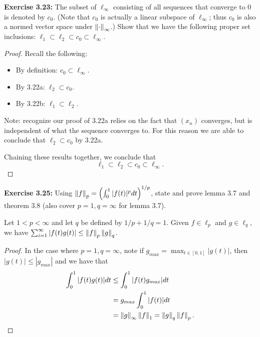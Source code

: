\documentclass{exam}
\begin{document}
\begin{questions}
    \newpage
    \question \textbf{Exercise 3.23:} The subset of $\ell_\infty$ consisting of all sequences that converge to 0 is denoted by $c_0$. (Note that $c_0$ is
    actually a linear subspace of $\ell_\infty$; thus $c_0$ is also a normed vector space under $\left\| \cdot \right\|_\infty$.) Show that
    we have the following proper set inclusions: $\ell_1 \subset \ell_2 \subset c_0 \subset \ell_\infty$.
    \begin{proof}
        Recall the following:
        \begin{itemize}
        \item By definition: $c_0 \subset \ell_\infty$.
        \item By 3.22a: $\ell_2 \subset c_0$.
        \item By 3.22b: $\ell_1 \subset \ell_2$.
        \end{itemize}

        Note: recognize our proof of 3.22a relies on the fact that $(x_n)$ converges, but is independent of what the sequence
        converges to. For this reason we are able to conclude that $\ell_2 \subset c_0$ by 3.22a.

        Chaining these results together, we conclude that
        $$\ell_1 \subset \ell_2 \subset c_0 \subset \ell_\infty.$$
    \end{proof}


    \newpage
    \question \textbf{Exercise 3.25:} Using $\left\| f \right\|_p = \left( \int_0^1 |f(t)|^p dt \right)^{1 / p}$, state and prove lemma 3.7 and theorem 3.8 (also cover $p = 1, q = \infty$ for lemma 3.7).
    \noqed
    \setcounter{section}{3}
    \setcounter{lemma}{6}
    \begin{lemma}\label{thm:main}
        Let $1 < p < \infty$ and let $q$ be defined by $1 / p + 1 / q = 1$. Given $f\in \ell_p$ and $g\in\ell_q$, we have 
        $\sum_{i = 1}^\infty |f(t)g(t)| \leq \left\| f \right\|_p\left\| g \right\|_q$.
    \end{lemma}
    \yesqed
    \begin{proof}
        In the case where $p = 1, q = \infty$, note if $g_{max} = \max_{t\in [0, 1]} |g(t)|$, then $|g(t)| \leq |g_{max}|$
        and we have that
        \begin{align*}
            \int_0^1 |f(t)g(t)|dt &\leq \int_0^1 |f(t)g_{max}|dt \\
            &= g_{max}\int_0^1 |f(t)|dt \\
            &= \left\| g \right\|_\infty \left\| f \right\|_1 = \left\| g \right\|_q \left\| f \right\|_p.
        \end{align*}


\end{proof}
\end{questions}
\end{document}
